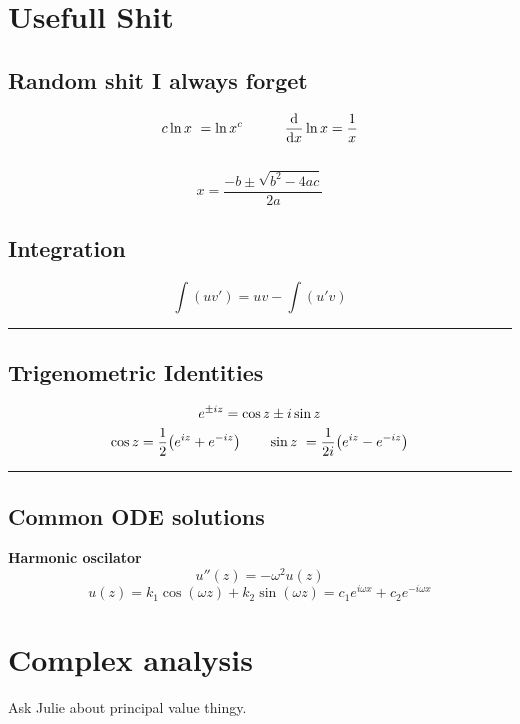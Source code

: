 \documentclass[10pt,a4paper]{article}
\renewcommand{\exp}{e^}
\newcommand{\holine}{\rule{286pt}{1pt}}
\newcommand{\half}{\frac{1}{2}}
\begin{document}
\begin{multicols}{2}


\section*{Usefull Shit}
\subsection*{Random shit I always forget}
\[
    c \ln{x} = \ln{x^c} \quad\quad\quad \dv{x}\ln{x} = \frac{1}{x}
\]
\\
\[
    x = \frac{-b\pm \sqrt{b^2 - 4ac}}{2a}
\]
\subsection*{Integration}
\[
    \int (uv') = uv - \int(u'v)
\]


\holine
\subsection*{Trigenometric Identities}
\[
    \exp{\pm i z} = \cos{z} \pm i\sin{z} \\
\]
\[
    \cos{z} = \half \qty(\exp{iz} + \exp{-iz}) \quad\quad
    \sin{z} = \frac{1}{2i}\qty(\exp{iz} - \exp{-iz})
\]


\holine
\subsection*{Common ODE solutions}
\textbf{Harmonic oscilator}
\[
    u''(z) = -\omega^2 u(z)
\]
\[
    u(z) = k_1 \cos(\omega z) + k_2\sin(\omega z) = c_1 \exp{i\omega x} + c_2 \exp{-i\omega x}
\]


\section*{Complex analysis}
Ask Julie about principal value thingy.





\newpage

\end{multicols}
\end{document}
